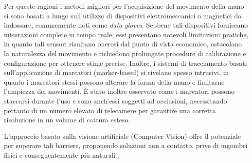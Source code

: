 Per queste ragioni i metodi migliori per l'acquisizione del movimento della mano si sono basati a lungo sull'utilizzo di dispositivi elettromeccanici o magnetici da indossare, comunemente noti come \emph{data gloves}.
Sebbene tali dispositivi forniscano misurazioni complete in tempo reale, essi presentano notevoli limitazioni pratiche, in quanto tali sensori risultano onerosi dal punto di vista economico, ostacolano la naturalezza del movimento e richiedono prolungate procedure di calibrazione e configurazione per ottenere stime precise.
Inoltre, i sistemi di tracciamento basati sull'applicazione di marcatori (marker-based) si rivelano spesso intrusivi, in quanto i marcatori stessi possono alterare la forma della mano e limitarne l'ampiezza dei movimenti.
È stato inoltre osservato come i marcatori possono staccarsi durante l'uso e sono anch'essi soggetti ad occlusioni, necessitando pertanto di un numero elevato di telecamere per garantire una corretta risoluzione in un volume di cattura esteso.

L'approccio basato sulla visione artificiale (Computer Vision) offre il potenziale per superare tali barriere, proponendo soluzioni non a contatto, prive di ingombri fisici e conseguentemente più naturali \cite{EROL200752}.
